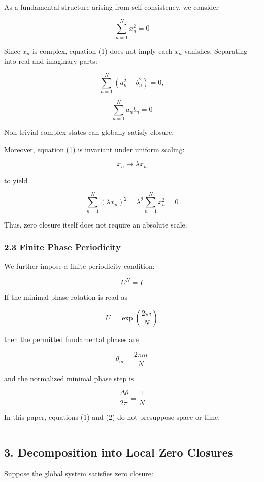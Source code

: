 \documentclass[
  a4paper,
]{article}
\begin{document}
As a fundamental structure arising from self-consistency, we consider

\[
\sum_{n=1}^{N}x_n^2=0
\tag{1}
\]

Since \(x_n\) is complex, equation (1) does not imply each \(x_n\)
vanishes. Separating into real and imaginary parts:

\[
\sum_{n=1}^{N}(a_n^2-b_n^2)=0,
\]

\[
\sum_{n=1}^{N}a_n b_n=0
\]

Non-trivial complex states can globally satisfy closure.

Moreover, equation (1) is invariant under uniform scaling:

\[
x_n\rightarrow\lambda x_n
\]

to yield

\[
\sum_{n=1}^{N}(\lambda x_n)^2
=
\lambda^2\sum_{n=1}^{N}x_n^2
=
0
\]

Thus, zero closure itself does not require an absolute scale.

\subsubsection{2.3 Finite Phase
Periodicity}\label{finite-phase-periodicity}

We further impose a finite periodicity condition:

\[
U^N=I
\tag{2}
\]

If the minimal phase rotation is read as

\[
U=\exp\left(\frac{2\pi i}{N}\right)
\]

then the permitted fundamental phases are

\[
\theta_m=\frac{2\pi m}{N}
\]

and the normalized minimal phase step is

\[
\frac{\Delta\theta}{2\pi}
=
\frac{1}{N}
\tag{3}
\]

In this paper, equations (1) and (2) do not presuppose space or time.

\begin{center}\rule{0.5\linewidth}{0.5pt}\end{center}

\subsection{3. Decomposition into Local Zero
Closures}\label{decomposition-into-local-zero-closures}

Suppose the global system satisfies zero closure:
\end{document}

